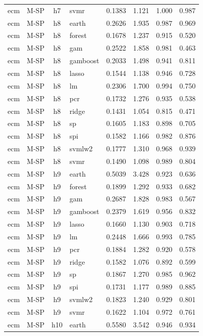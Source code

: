 \begin{ThreePartTable}
\begin{longtable}[t]{llclcccc}
ecm & M-SP & h7 & svmr & 0.1383 & 1.121 & 1.000 & 0.987\\
\addlinespace
ecm & M-SP & h8 & earth & 0.2626 & 1.935 & 0.987 & 0.969\\
ecm & M-SP & h8 & forest & 0.1678 & 1.237 & 0.915 & 0.520\\
ecm & M-SP & h8 & gam & 0.2522 & 1.858 & 0.981 & 0.463\\
ecm & M-SP & h8 & gamboost & 0.2033 & 1.498 & 0.941 & 0.811\\
ecm & M-SP & h8 & lasso & 0.1544 & 1.138 & 0.946 & 0.728\\
ecm & M-SP & h8 & lm & 0.2306 & 1.700 & 0.994 & 0.750\\
ecm & M-SP & h8 & pcr & 0.1732 & 1.276 & 0.935 & 0.538\\
ecm & M-SP & h8 & ridge & 0.1431 & 1.054 & 0.815 & 0.471\\
ecm & M-SP & h8 & sp & 0.1605 & 1.183 & 0.898 & 0.705\\
ecm & M-SP & h8 & spi & 0.1582 & 1.166 & 0.982 & 0.876\\
ecm & M-SP & h8 & svmlw2 & 0.1777 & 1.310 & 0.968 & 0.939\\
ecm & M-SP & h8 & svmr & 0.1490 & 1.098 & 0.989 & 0.804\\
\addlinespace
ecm & M-SP & h9 & earth & 0.5039 & 3.428 & 0.923 & 0.636\\
ecm & M-SP & h9 & forest & 0.1899 & 1.292 & 0.933 & 0.682\\
ecm & M-SP & h9 & gam & 0.2687 & 1.828 & 0.983 & 0.567\\
ecm & M-SP & h9 & gamboost & 0.2379 & 1.619 & 0.956 & 0.832\\
ecm & M-SP & h9 & lasso & 0.1660 & 1.130 & 0.903 & 0.718\\
ecm & M-SP & h9 & lm & 0.2448 & 1.666 & 0.993 & 0.785\\
ecm & M-SP & h9 & pcr & 0.1884 & 1.282 & 0.920 & 0.578\\
ecm & M-SP & h9 & ridge & 0.1582 & 1.076 & 0.892 & 0.599\\
ecm & M-SP & h9 & sp & 0.1867 & 1.270 & 0.985 & 0.962\\
ecm & M-SP & h9 & spi & 0.1731 & 1.177 & 0.989 & 0.885\\
ecm & M-SP & h9 & svmlw2 & 0.1823 & 1.240 & 0.929 & 0.801\\
ecm & M-SP & h9 & svmr & 0.1622 & 1.104 & 0.972 & 0.761\\
\addlinespace
ecm & M-SP & h10 & earth & 0.5580 & 3.542 & 0.946 & 0.934\\

\end{longtable}
\end{ThreePartTable}

